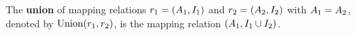




\begin{definition}
	\label{def:union_operator}
	\normalfont
	The \textbf{union} of mapping relations $r_{1} = (A_{1}, I_{1})$ and $r_{2} = (A_{2}, I_{2})$ with $A_1 = A_2$, denoted by $\text{Union}(r_{1},r_{2})$, is the mapping relation $(A_1, I_1 \cup I_2)$.
\end{definition}


